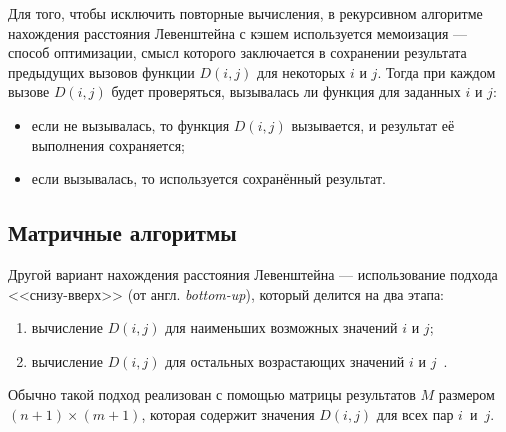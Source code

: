 Для того, чтобы исключить повторные вычисления, в рекурсивном алгоритме нахождения расстояния Левенштейна с кэшем используется мемоизация --- способ оптимизации, смысл которого заключается в сохранении результата предыдущих вызовов функции \(D(i, j)\) для некоторых \(i\) и \(j\). Тогда при каждом вызове \(D(i, j)\) будет проверяться, вызывалась ли функция для заданных \(i\) и \(j\):

\begin{itemize}
    \item если не вызывалась, то функция \(D(i, j)\) вызывается, и результат её выполнения сохраняется;
    \item если вызывалась, то используется сохранённый результат.
\end{itemize}

\subsection{Матричные алгоритмы}\label{sect:dyn_lev}

Другой вариант нахождения расстояния Левенштейна --- использование подхода <<снизу-вверх>> (от англ. \textit{bottom-up}), который делится на два этапа:

\begin{enumerate}
    \item вычисление \(D(i, j)\) для наименьших возможных значений \(i\) и \(j\);
    \item вычисление \(D(i, j)\) для остальных возрастающих значений \(i\) и \(j\)~\cite{cambridge}.
\end{enumerate}

Обычно такой подход реализован с помощью матрицы результатов \(M\) размером \((n + 1) \times (m + 1)\), которая содержит значения \(D(i, j)\) для всех пар \(i\)~и~\(j\).

